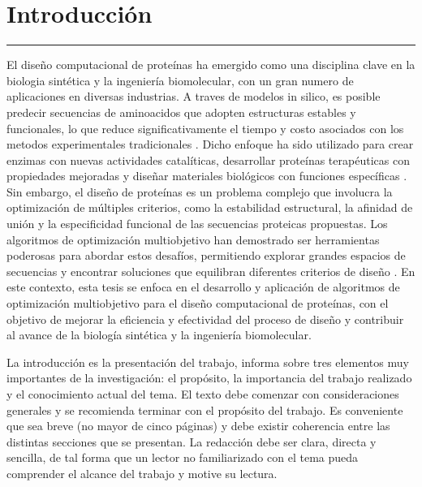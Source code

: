 \chapter{Introducci\'on}\label{capit:cap1}
\vspace{-2.0325ex}%
\noindent
\rule{\textwidth}{0.5pt}
\vspace{-5.5ex}%
\newcommand{\pushline}{\Indp}%

El diseño computacional de proteínas ha emergido como una disciplina clave en la biologia sintética y la ingeniería biomolecular, con un gran numero de aplicaciones en diversas industrias. A traves de modelos in silico, es posible predecir secuencias de aminoacidos que adopten estructuras estables y funcionales, lo que reduce significativamente el tiempo y costo asociados con los metodos experimentales tradicionales \citep{WOOLFSON2021167160}. Dicho enfoque ha sido utilizado para crear enzimas con nuevas actividades catalíticas, desarrollar proteínas terapéuticas con propiedades mejoradas y diseñar materiales biológicos con funciones específicas \citep{Huang2016, Kuhlman2003, Langan2019}. Sin embargo, el diseño de proteínas es un problema complejo que involucra la optimización de múltiples criterios, como la estabilidad estructural, la afinidad de unión y la especificidad funcional de las secuencias proteicas propuestas. Los algoritmos de optimización multiobjetivo han demostrado ser herramientas poderosas para abordar estos desafíos, permitiendo explorar grandes espacios de secuencias y encontrar soluciones que equilibran diferentes criterios de diseño \citep{Deb2001}. En este contexto, esta tesis se enfoca en el desarrollo y aplicación de algoritmos de optimización multiobjetivo para el diseño computacional de proteínas, con el objetivo de mejorar la eficiencia y efectividad del proceso de diseño y contribuir al avance de la biología sintética y la ingeniería biomolecular.



La introducción es la presentación del trabajo, informa sobre tres elementos muy importantes de la investigación: el propósito, la importancia del trabajo realizado y el conocimiento actual del tema. El texto debe comenzar con consideraciones generales y se recomienda terminar con el propósito del trabajo. Es conveniente que sea breve (no mayor de cinco páginas) y debe existir coherencia entre las distintas secciones que se presentan. La redacción debe ser clara, directa y sencilla, de tal forma que un lector no familiarizado con el tema pueda comprender el alcance del trabajo y motive su lectura.

